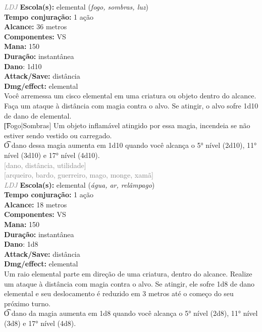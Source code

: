 \documentclass{RPG_Adventure}[2021/10/20]
\begin{document}
{\tiny \textcolor{gray}{\textit{LDJ}}}\jump{}
{\small \t \textbf{Escola(s):} elemental (\textit{fogo, sombras, luz})\\\t \textbf{Tempo conjuração:} 1 ação\\\t \textbf{Alcance:} 36 metros\\\t \textbf{Componentes:} VS\\\t \textbf{Mana:} 150\\\t \textbf{Duração:} instantânea\\\t \textbf{Dano}: 1d10\\\t \textbf{Attack/Save:} distância\\\t \textbf{Dmg/effect:} elemental\\}
{\normalsize Você arremessa um cisco elemental em uma criatura ou objeto dentro do alcance. Faça um ataque à distância com magia contra o alvo. Se atingir, o alvo sofre 1d10 de dano de elemental.\\\t [Fogo|Sombras] Um objeto inflamável atingido por essa magia, incendeia se não estiver sendo vestido ou carregado.\\\t O dano dessa magia aumenta em 1d10 quando você alcança o 5° nível (2d10), 11° nível (3d10) e 17° nível (4d10).\\}
{\scriptsize \textcolor{gray}{[dano, distância, utilidade]\\}}
{\scriptsize \textcolor{gray}{[arqueiro, bardo, guerreiro, mago, monge, xamã]\\}}
{\tiny \textcolor{gray}{\textit{LDJ}}}\jump{}
{\small \t \textbf{Escola(s):} elemental (\textit{água, ar, relâmpago})\\\t \textbf{Tempo conjuração:} 1 ação\\\t \textbf{Alcance:} 18 metros\\\t \textbf{Componentes:} VS\\\t \textbf{Mana:} 150\\\t \textbf{Duração:} instantânea\\\t \textbf{Dano}: 1d8\\\t \textbf{Attack/Save:} distância\\\t \textbf{Dmg/effect:} elemental\\}
{\normalsize Um raio elemental parte em direção de uma criatura, dentro do alcance. Realize um ataque à distância com magia contra o alvo. Se atingir, ele sofre 1d8 de dano elemental e seu deslocamento é reduzido em 3 metros até o começo do seu próximo turno.\\\t O dano da magia aumenta em 1d8 quando você alcança o 5° nível (2d8), 11° nível (3d8) e 17° nível (4d8).\\}
\end{document}
